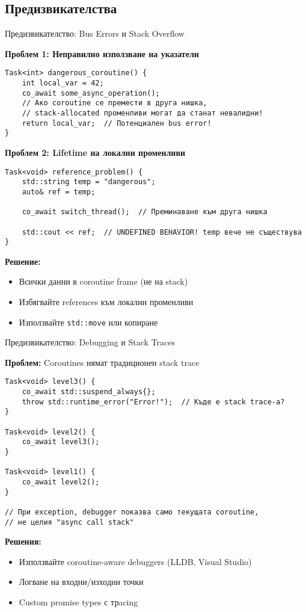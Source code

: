 \documentclass[aspectratio=169]{beamer}
\begin{document}
\subsection{Предизвикателства}

\begin{frame}[fragile]{Предизвикателство: Bus Errors и Stack Overflow}

\textbf{Проблем 1: Неправилно използване на указатели}

\begin{lstlisting}[basicstyle=\ttfamily\tiny]
Task<int> dangerous_coroutine() {
    int local_var = 42;
    co_await some_async_operation();
    // Ако coroutine се премести в друга нишка,
    // stack-allocated променливи могат да станат невалидни!
    return local_var;  // Потенциален bus error!
}
\end{lstlisting}

\textbf{Проблем 2: Lifetime на локални променливи}

\begin{lstlisting}[basicstyle=\ttfamily\tiny]
Task<void> reference_problem() {
    std::string temp = "dangerous";
    auto& ref = temp;
    
    co_await switch_thread();  // Преминаване към друга нишка
    
    std::cout << ref;  // UNDEFINED BEHAVIOR! temp вече не съществува
}
\end{lstlisting}

\textbf{Решение:}
\begin{itemize}
    \item Всички данни в coroutine frame (не на stack)
    \item Избягвайте references към локални променливи
    \item Използвайте \texttt{std::move} или копиране
\end{itemize}
\end{frame}

\begin{frame}[fragile]{Предизвикателство: Debugging и Stack Traces}

\textbf{Проблем:} Coroutines нямат традиционен stack trace

\begin{lstlisting}[basicstyle=\ttfamily\tiny]
Task<void> level3() {
    co_await std::suspend_always{};
    throw std::runtime_error("Error!");  // Къде е stack trace-а?
}

Task<void> level2() {
    co_await level3();
}

Task<void> level1() {
    co_await level2();
}

// При exception, debugger показва само текущата coroutine,
// не целия "async call stack"
\end{lstlisting}

\textbf{Решения:}
\begin{itemize}
    \item Използвайте coroutine-aware debuggers (LLDB, Visual Studio)
    \item Логване на входни/изходни точки
    \item Custom promise types с трacing
\end{itemize}
\end{frame}
\end{document}
